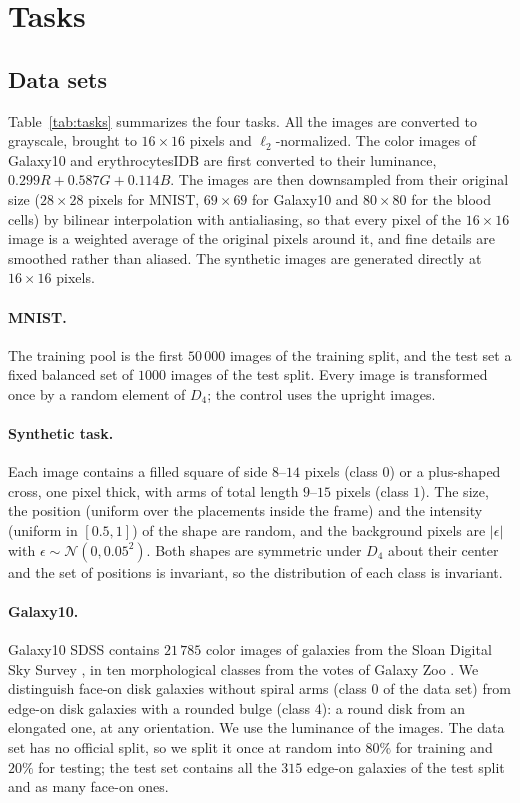 \documentclass[aps,pra,reprint,superscriptaddress,longbibliography]{revtex4-2}
\begin{document}
\section{Tasks}\label{app:tasks}

\subsection{Data sets}

Table~\ref{tab:tasks} summarizes the four tasks. All the images are converted to grayscale, brought to $16\times16$ pixels and $\ell_2$-normalized. The color images of Galaxy10 and erythrocytesIDB are first converted to their luminance, $0.299R+0.587G+0.114B$. The images are then downsampled from their original size ($28\times28$ pixels for MNIST, $69\times69$ for Galaxy10 and $80\times80$ for the blood cells) by bilinear interpolation with antialiasing, so that every pixel of the $16\times16$ image is a weighted average of the original pixels around it, and fine details are smoothed rather than aliased. The synthetic images are generated directly at $16\times16$ pixels. 

\paragraph{MNIST.} The training pool is the first $50\,000$ images of the training split, and the test set a fixed balanced set of $1000$ images of the test split. Every image is transformed once by a random element of $D_4$; the control uses the upright images.

\paragraph{Synthetic task.} Each image contains a filled square of side $8$--$14$ pixels (class $0$) or a plus-shaped cross, one pixel thick, with arms of total length $9$--$15$ pixels (class $1$). The size, the position (uniform over the placements inside the frame) and the intensity (uniform in $[0.5,1]$) of the shape are random, and the background pixels are $|\epsilon|$ with $\epsilon\sim\mathcal{N}(0,0.05^2)$. Both shapes are symmetric under $D_4$ about their center and the set of positions is invariant, so the distribution of each class is invariant.

\paragraph{Galaxy10.} Galaxy10 SDSS \citep{galaxy10} contains $21\,785$ color images of galaxies from the Sloan Digital Sky Survey \citep{york2000sloan}, in ten morphological classes from the votes of Galaxy Zoo \citep{lintott2008galaxy,lintott2011galaxy,willett2013galaxy}. We distinguish face-on disk galaxies without spiral arms (class $0$ of the data set) from edge-on disk galaxies with a rounded bulge (class $4$): a round disk from an elongated one, at any orientation. We use the luminance of the images. The data set has no official split, so we split it once at random into $80\%$ for training and $20\%$ for testing; the test set contains all the $315$ edge-on galaxies of the test split and as many face-on ones.
\end{document}
